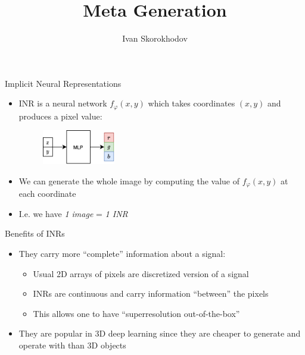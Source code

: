 \documentclass[10pt]{beamer}
\title{Meta Generation}
\author{Ivan Skorokhodov}
\begin{document}
\begin{frame}
    \titlepage
\end{frame}


\begin{frame}{Implicit Neural Representations}
\begin{itemize}
    \item\pause INR is a neural network $f_\varphi(x,y)$ which takes coordinates $(x,y)$ and produces a pixel value:
    \begin{figure}
        \centering
        \includegraphics[width=0.3\textwidth]{images/inr}
    \end{figure}
    \item\pause We can generate the whole image by computing the value of $f_\varphi(x,y)$ at each coordinate
    \item\pause I.e. we have \textit{1 image} = \textit{1 INR}
\end{itemize}
\end{frame}


\begin{frame}{Benefits of INRs}
    \begin{itemize}
        \item\pause They carry more ``complete'' information about a signal:
        \begin{itemize}
            \item Usual 2D arrays of pixels are discretized version of a signal
            \item INRs are continuous and carry information ``between'' the pixels
            \item This allows one to have ``superresolution out-of-the-box''
        \end{itemize}
        \item\pause They are popular in 3D deep learning since they are cheaper to generate and operate with than 3D objects
    \end{itemize}
\end{frame}
\end{document}
